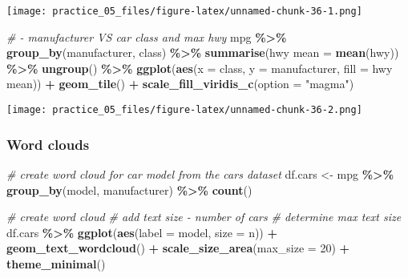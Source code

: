 \documentclass[
]{article}
\newenvironment{Shaded}{\begin{snugshade}}{\end{snugshade}}
\newcommand{\AttributeTok}[1]{\textcolor[rgb]{0.13,0.29,0.53}{#1}}
\newcommand{\CommentTok}[1]{\textcolor[rgb]{0.56,0.35,0.01}{\textit{#1}}}
\newcommand{\DecValTok}[1]{\textcolor[rgb]{0.00,0.00,0.81}{#1}}
\newcommand{\FunctionTok}[1]{\textcolor[rgb]{0.13,0.29,0.53}{\textbf{#1}}}
\newcommand{\NormalTok}[1]{#1}
\newcommand{\OtherTok}[1]{\textcolor[rgb]{0.56,0.35,0.01}{#1}}
\newcommand{\SpecialCharTok}[1]{\textcolor[rgb]{0.81,0.36,0.00}{\textbf{#1}}}
\newcommand{\StringTok}[1]{\textcolor[rgb]{0.31,0.60,0.02}{#1}}
\begin{document}
\texttt{[image: practice\_05\_files/figure-latex/unnamed-chunk-36-1.png]}

\begin{Shaded}
\begin{Highlighting}[]
\CommentTok{\#   {-} manufacturer VS car class and max hwy}
\NormalTok{mpg }\SpecialCharTok{\%\textgreater{}\%} 
  \FunctionTok{group\_by}\NormalTok{(manufacturer, class) }\SpecialCharTok{\%\textgreater{}\%} 
  \FunctionTok{summarise}\NormalTok{(}\StringTok{\textasciigrave{}}\AttributeTok{hwy mean}\StringTok{\textasciigrave{}} \OtherTok{=} \FunctionTok{mean}\NormalTok{(hwy)) }\SpecialCharTok{\%\textgreater{}\%} 
  \FunctionTok{ungroup}\NormalTok{() }\SpecialCharTok{\%\textgreater{}\%} 
  \FunctionTok{ggplot}\NormalTok{(}\FunctionTok{aes}\NormalTok{(}\AttributeTok{x =}\NormalTok{ class,}
             \AttributeTok{y =}\NormalTok{ manufacturer,}
             \AttributeTok{fill =} \StringTok{\textasciigrave{}}\AttributeTok{hwy mean}\StringTok{\textasciigrave{}}\NormalTok{)) }\SpecialCharTok{+}
  \FunctionTok{geom\_tile}\NormalTok{() }\SpecialCharTok{+}
  \FunctionTok{scale\_fill\_viridis\_c}\NormalTok{(}\AttributeTok{option =} \StringTok{"magma"}\NormalTok{)}
\end{Highlighting}
\end{Shaded}

\texttt{[image: practice\_05\_files/figure-latex/unnamed-chunk-36-2.png]}

\subsubsection{Word clouds}\label{word-clouds}

\begin{Shaded}
\begin{Highlighting}[]
\CommentTok{\# create word cloud for car model from the cars dataset}
\NormalTok{df.cars }\OtherTok{\textless{}{-}}\NormalTok{ mpg }\SpecialCharTok{\%\textgreater{}\%} 
  \FunctionTok{group\_by}\NormalTok{(model, manufacturer) }\SpecialCharTok{\%\textgreater{}\%} 
  \FunctionTok{count}\NormalTok{()}

\CommentTok{\# create word cloud}
\CommentTok{\#   add text size {-} number of cars}
\CommentTok{\#   determine max text size}
\NormalTok{df.cars }\SpecialCharTok{\%\textgreater{}\%} 
  \FunctionTok{ggplot}\NormalTok{(}\FunctionTok{aes}\NormalTok{(}\AttributeTok{label =}\NormalTok{ model, }
             \AttributeTok{size =}\NormalTok{ n)) }\SpecialCharTok{+}
  \FunctionTok{geom\_text\_wordcloud}\NormalTok{() }\SpecialCharTok{+}
  \FunctionTok{scale\_size\_area}\NormalTok{(}\AttributeTok{max\_size =} \DecValTok{20}\NormalTok{) }\SpecialCharTok{+}
  \FunctionTok{theme\_minimal}\NormalTok{()}
\end{Highlighting}
\end{Shaded}
\end{document}

